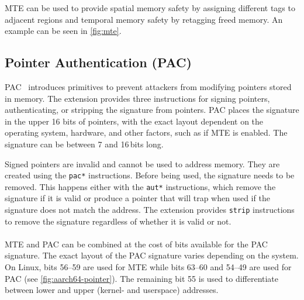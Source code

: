 \Ac{MTE} can be used to provide spatial memory safety by assigning different tags to adjacent regions and temporal memory safety by retagging freed memory.
An example can be seen in \cref{fig:mte}.

\subsection{Pointer Authentication (PAC)}
\label{subsec:pac}

\Ac{PAC}~\cite{Qualcomm2017PointerAuth} introduces primitives to prevent attackers from modifying pointers stored in memory.
The extension provides three instructions for signing pointers, authenticating, or stripping the signature from pointers.
\ac{PAC} places the signature in the upper 16 bits of pointers, with the exact layout dependent on the operating system, hardware, and other factors, such as if \ac{MTE} is enabled.
The signature can be between 7 and 16\,bits long.

Signed pointers are invalid and cannot be used to address memory.
They are created using the \texttt{pac*} instructions.
Before being used, the signature needs to be removed.
This happens either with the \texttt{aut*} instructions, which remove the signature if it is valid or produce a pointer that will trap when used if the signature does not match the address.
The extension provides \texttt{strip} instructions to remove the signature regardless of whether it is valid or not.

\paragraph{} \ac{MTE} and \ac{PAC} can be combined at the cost of bits available for the \ac{PAC} signature.
The exact layout of the \ac{PAC} signature varies depending on the system.
On Linux, bits 56--59 are used for \ac{MTE} while bits 63--60 and 54--49 are used for \ac{PAC} (see \cref{fig:aarch64-pointer}).
The remaining bit 55 is used to differentiate between lower and upper (kernel- and userspace) addresses.
